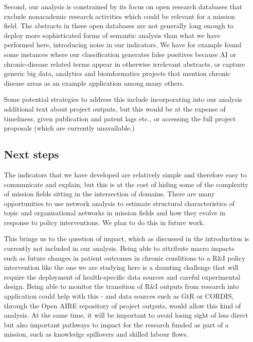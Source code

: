 \documentclass[11pt]{article}
\begin{document}
Second, our analysis is constrained by its focus on open research databases that exclude nonacademic research activities which could be relevant for a mission field. The abstracts in these open databases are not generally long enough to deploy more sophisticated forms of semantic analysis than what we have performed here, introducing noise in our indicators. We have for example found some instances where our classification generates false positives because AI or chronic-disease related terms appear in otherwise irrelevant abstracts, or capture generic big data, analytics and bioinformatics projects that mention chronic disease areas as an example application among many others. 

Some potential strategies to address this include incorporating into our analysis additional text about project outputs, but this would be at the expense of timeliness, given publication and patent lags etc., or accessing the full project proposals (which are currently unavailable.)

\subsection{Next steps}
The indicators that we have developed are relatively simple and therefore easy to communicate and explain, but this is at the cost of hiding some of the complexity of mission fields sitting in the intersection of domains. There are many opportunities to use network analysis to estimate structural characteristics of topic and organisational networks in mission fields and how they evolve in response to policy interventions. We plan to do this in future work. 

This brings us to the question of impact, which as discussed in the introduction is currently not included in our analysis. Being able to attribute macro impacts such as future changes in patient outcomes in chronic conditions to a R&I policy intervention like the one we are studying here is a daunting challenge that will require the deployment of health-specific data sources and careful experimental design. Being able to monitor the transition of R\&I outputs from research into application could help with this - and data sources such as GtR or CORDIS, through the Open AIRE repository of project outputs, would allow this kind of analysis. At the same time, it will be important to avoid losing sight of less direct but also important pathways to impact for the research funded as part of a mission, such as knowledge spillovers and skilled labour flows.
\end{document}
